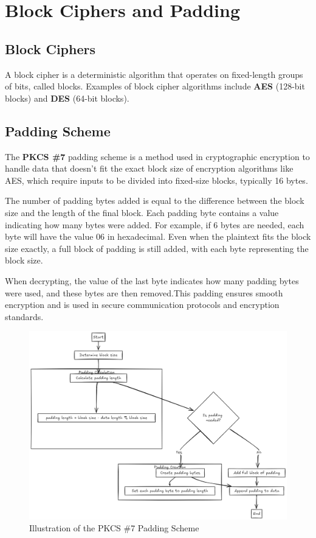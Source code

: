 \documentclass[conference]{IEEEtran}
\begin{document}
\section{Block Ciphers and Padding}
\subsection{Block Ciphers}
A block cipher is a deterministic algorithm that operates on fixed-length groups of bits, called blocks. Examples of block cipher algorithms include {\bf AES} (128-bit blocks) and {\bf DES} (64-bit blocks). 

\subsection{Padding Scheme}
The {\bf PKCS \#7} padding scheme is a method used in cryptographic encryption to handle data that doesn’t fit the exact block size of encryption algorithms like AES, which require inputs to be divided into fixed-size blocks, typically 16 bytes.

The number of padding bytes added is equal to the difference between the block size and the length of the final block. Each padding byte contains a value indicating how many bytes were added. For example, if 6 bytes are needed, each byte will have the value 06 in hexadecimal. Even when the plaintext fits the block size exactly, a full block of padding is still added, with each byte representing the block size.

When decrypting, the value of the last byte indicates how many padding bytes were used, and these bytes are then removed.This padding ensures smooth encryption and is used in secure communication protocols and encryption standards.

\begin{figure}[!htb]
    \centering
    \includegraphics[width=\linewidth]{./../padding.png}
    \caption{Illustration of the PKCS \#7 Padding Scheme}
    \label{fig:padding-scheme}
\end{figure}
\end{document}
